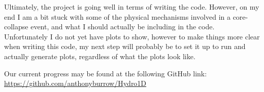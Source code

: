 \documentclass[12pt]{article}
\begin{document}
Ultimately, the project is going well in terms of writing the code. However, on
my end I am a bit stuck with some of the physical mechanisms involved in a
core-collapse event, and what I should actually be including in the code.
Unfortunately I do not yet have plots to show, however to make things more
clear when writing this code, my next step will probably be to set it up to run
and actually generate plots, regardless of what the plots look like.

\vspace{5mm}

Our current progress may be found at the following GitHub link:
\url{https://github.com/anthonyburrow/Hydro1D}


\end{document}

